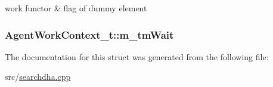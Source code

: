 work functor \& flag of dummy element 

\hypertarget{structAgentWorkContext__t_aae16338158e38e9594f211271fddc90c}{
\subsubsection[{m\-\_\-tm\-Wait}]{ Agent\-Work\-Context\-\_\-t\-::m\-\_\-tm\-Wait}}\label{structAgentWorkContext__t_aae16338158e38e9594f211271fddc90c}


The documentation for this struct was generated from the following file\-:\begin{DoxyCompactItemize}
\item 
src/\hyperlink{searchdha_8cpp}{searchdha.\-cpp}\end{DoxyCompactItemize}
